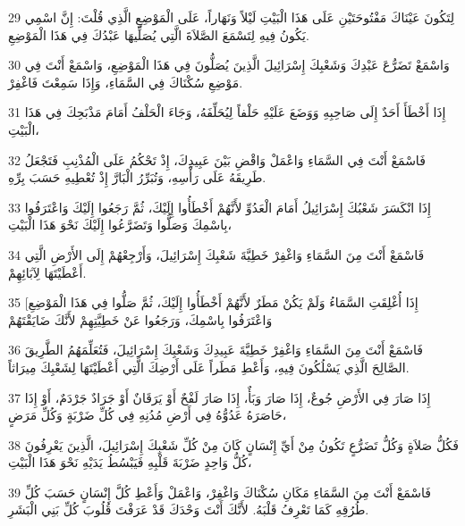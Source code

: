 \par 29 لِتَكُونَ عَيْنَاكَ مَفْتُوحَتَيْنِ عَلَى هَذَا الْبَيْتِ لَيْلاً وَنَهَاراً، عَلَى الْمَوْضِعِ الَّذِي قُلْتَ: إِنَّ اسْمِي يَكُونُ فِيهِ لِتَسْمَعَ الصَّلاَةَ الَّتِي يُصَلِّيهَا عَبْدُكَ فِي هَذَا الْمَوْضِعِ.
\par 30 وَاسْمَعْ تَضَرُّعَ عَبْدِكَ وَشَعْبِكَ إِسْرَائِيلَ الَّذِينَ يُصَلُّونَ فِي هَذَا الْمَوْضِعِ، وَاسْمَعْ أَنْتَ فِي مَوْضِعِ سُكْنَاكَ فِي السَّمَاءِ، وَإِذَا سَمِعْتَ فَاغْفِرْ.
\par 31 إِذَا أَخْطَأَ أَحَدٌ إِلَى صَاحِبِهِ وَوَضَعَ عَلَيْهِ حَلْفاً لِيُحَلِّفَهُ، وَجَاءَ الْحَلْفُ أَمَامَ مَذْبَحِكَ فِي هَذَا الْبَيْتِ،
\par 32 فَاسْمَعْ أَنْتَ فِي السَّمَاءِ وَاعْمَلْ وَاقْضِ بَيْنَ عَبِيدِكَ، إِذْ تَحْكُمُ عَلَى الْمُذْنِبِ فَتَجْعَلُ طَرِيقَهُ عَلَى رَأْسِهِ، وَتُبَرِّرُ الْبَارَّ إِذْ تُعْطِيهِ حَسَبَ بِرِّهِ.
\par 33 إِذَا انْكَسَرَ شَعْبُكَ إِسْرَائِيلُ أَمَامَ الْعَدُوِّ لأَنَّهُمْ أَخْطَأُوا إِلَيْكَ، ثُمَّ رَجَعُوا إِلَيْكَ وَاعْتَرَفُوا بِاسْمِكَ وَصَلُّوا وَتَضَرَّعُوا إِلَيْكَ نَحْوَ هَذَا الْبَيْتِ،
\par 34 فَاسْمَعْ أَنْتَ مِنَ السَّمَاءِ وَاغْفِرْ خَطِيَّةَ شَعْبِكَ إِسْرَائِيلَ، وَأَرْجِعْهُمْ إِلَى الأَرْضِ الَّتِي أَعْطَيْتَهَا لِآبَائِهِمْ.
\par 35 [إِذَا أُغْلِقَتِ السَّمَاءُ وَلَمْ يَكُنْ مَطَرٌ لأَنَّهُمْ أَخْطَأُوا إِلَيْكَ، ثُمَّ صَلُّوا فِي هَذَا الْمَوْضِعِ وَاعْتَرَفُوا بِاسْمِكَ، وَرَجَعُوا عَنْ خَطِيَّتِهِمْ لأَنَّكَ ضَايَقْتَهُمْ
\par 36 فَاسْمَعْ أَنْتَ مِنَ السَّمَاءِ وَاغْفِرْ خَطِيَّةَ عَبِيدِكَ وَشَعْبِكَ إِسْرَائِيلَ، فَتُعَلِّمَهُمُ الطَّرِيقَ الصَّالِحَ الَّذِي يَسْلُكُونَ فِيهِ، وَأَعْطِ مَطَراً عَلَى أَرْضِكَ الَّتِي أَعْطَيْتَهَا لِشَعْبِكَ مِيرَاثاً.
\par 37 إِذَا صَارَ فِي الأَرْضِ جُوعٌ، إِذَا صَارَ وَبَأٌ، إِذَا صَارَ لَفْحٌ أَوْ يَرَقَانٌ أَوْ جَرَادٌ جَرْدَمٌ، أَوْ إِذَا حَاصَرَهُ عَدُوُّهُ فِي أَرْضِ مُدُنِهِ فِي كُلِّ ضَرْبَةٍ وَكُلِّ مَرَضٍ،
\par 38 فَكُلُّ صَلاَةٍ وَكُلُّ تَضَرُّعٍ تَكُونُ مِنْ أَيِّ إِنْسَانٍ كَانَ مِنْ كُلِّ شَعْبِكَ إِسْرَائِيلَ، الَّذِينَ يَعْرِفُونَ كُلُّ وَاحِدٍ ضَرْبَةَ قَلْبِهِ فَيَبْسُطُ يَدَيْهِ نَحْوَ هَذَا الْبَيْتِ،
\par 39 فَاسْمَعْ أَنْتَ مِنَ السَّمَاءِ مَكَانِ سُكْنَاكَ وَاغْفِرْ، وَاعْمَلْ وَأَعْطِ كُلَّ إِنْسَانٍ حَسَبَ كُلِّ طُرُقِهِ كَمَا تَعْرِفُ قَلْبَهُ. لأَنَّكَ أَنْتَ وَحْدَكَ قَدْ عَرَفْتَ قُلُوبَ كُلِّ بَنِي الْبَشَرِ.
